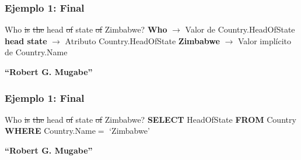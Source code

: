 \begin{frame}[t]
\frametitle{Ejemplo 1: Final}
\Large{{\color{blue}Who} \st{is} \st{the} {\color{blue}head} \st{of} {\color{blue}state} \st{of} {\color{purple}Zimbabwe}? 
\bigskip
\newline
\textbf{{\color{blue}Who}} $\rightarrow$ Valor de Country.HeadOfState \newline
\textbf{{\color{blue}head state}} $\rightarrow$ Atributo Country.HeadOfState \newline
\textbf{{\color{purple}Zimbabwe}} $\rightarrow$ Valor implícito de Country.Name \newline
}

\bigskip

{\color{white}\textbf{``Robert G. Mugabe''}}

\end{frame}

\begin{frame}[t]
\frametitle{Ejemplo 1: Final}
\Large{{\color{blue}Who} \st{is} \st{the} {\color{blue}head} \st{of} {\color{blue}state} \st{of} {\color{purple}Zimbabwe}? 
\bigskip
\newline
\textbf{{\color{purple}SELECT}} HeadOfState \newline
{\color{purple}\textbf{FROM}} Country \newline
{\color{purple}\textbf{WHERE}} Country.Name$=$ {\color{green}`Zimbabwe'}
}

\bigskip

\textbf{``Robert G. Mugabe''}

\end{frame}
